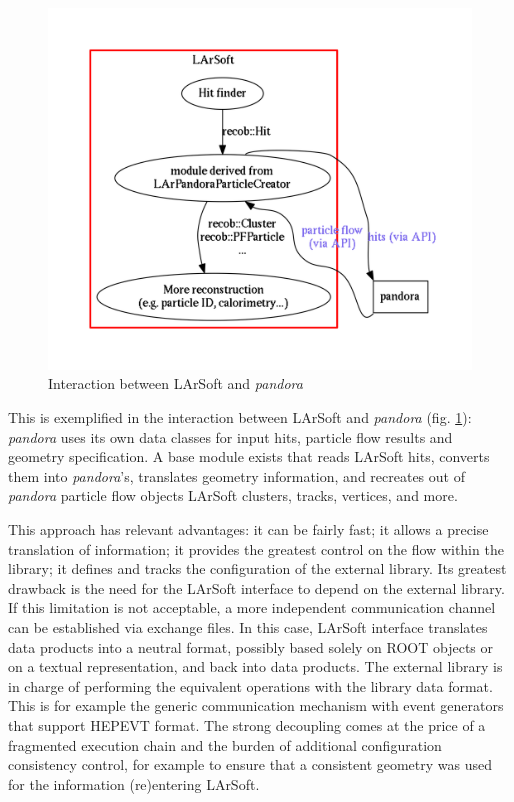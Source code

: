\begin{figure}[htbp]
\centering
\includegraphics[width=\textwidth]{figures/LArSoftAndPandora.pdf}
\caption{\label{fig:LArSoftAndPandora}Interaction between LArSoft and
\emph{pandora}}
\end{figure}

This is exemplified in the interaction between LArSoft and
\emph{pandora} (fig. \ref{fig:LArSoftAndPandora}): \emph{pandora} uses
its own data classes for input hits, particle flow results and geometry
specification. A base module exists that reads LArSoft hits, converts
them into \emph{pandora}'s, translates geometry information, and
recreates out of \emph{pandora} particle flow objects LArSoft clusters,
tracks, vertices, and more.

This approach has relevant advantages: it can be fairly fast; it allows
a precise translation of information; it provides the greatest control
on the flow within the library; it defines and tracks the configuration
of the external library. Its greatest drawback is the need for the
LArSoft interface to depend on the external library. If this limitation
is not acceptable, a more independent communication channel can be
established via exchange files. In this case, LArSoft interface
translates data products into a neutral format, possibly based solely on
ROOT objects or on a textual representation, and back into data
products. The external library is in charge of performing the equivalent
operations with the library data format. This is for example the generic
communication mechanism with event generators that support HEPEVT
format. The strong decoupling comes at the price of a fragmented
execution chain and the burden of additional configuration consistency
control, for example to ensure that a consistent geometry was used for
the information (re)entering LArSoft.


